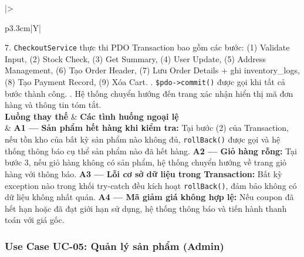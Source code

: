 \documentclass[11pt, a4paper]{article}
\begin{document}
\begin{table}[H]
\begin{tabularx}{\linewidth}{|>{\raggedright\arraybackslash}p{3.3cm}|Y|}
          7. \texttt{CheckoutService} thực thi PDO Transaction bao gồm các bước: (1) Validate Input, (2) Stock Check, (3) Get Summary, (4) User Update, (5) Address Management, (6) Tạo Order Header, (7) Lưu Order Details + ghi inventory\_logs, (8) Tạo Payment Record, (9) Xóa Cart. . \texttt{\$pdo->commit()} được gọi khi tất cả bước thành công. . Hệ thống chuyển hướng đến trang xác nhận hiển thị mã đơn hàng và thông tin tóm tắt. \\ \hline
        \textbf{Luồng thay thế} & \textbf{Các tình huống ngoại lệ} \\ \hline
        & \textbf{A1 --- Sản phẩm hết hàng khi kiểm tra:} Tại bước (2) của Transaction, nếu tồn kho của bất kỳ sản phẩm nào không đủ, \texttt{rollBack()} được gọi và hệ thống thông báo cụ thể sản phẩm nào đã hết hàng. \newline
          \textbf{A2 --- Giỏ hàng rỗng:} Tại bước 3, nếu giỏ hàng không có sản phẩm, hệ thống chuyển hướng về trang giỏ hàng với thông báo. \newline
          \textbf{A3 --- Lỗi cơ sở dữ liệu trong Transaction:} Bất kỳ exception nào trong khối try-catch đều kích hoạt \texttt{rollBack()}, đảm bảo không có dữ liệu không nhất quán. \newline
          \textbf{A4 --- Mã giảm giá không hợp lệ:} Nếu coupon đã hết hạn hoặc đã đạt giới hạn sử dụng, hệ thống thông báo và tiến hành thanh toán với giá gốc. \\ \hline
    \end{tabularx}
\end{table}

\subsubsection{Use Case UC-05: Quản lý sản phẩm (Admin)}
\end{document}
